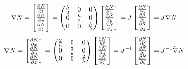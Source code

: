 \documentclass[11pt]{article}
\newcommand{\nx}{\frac{\partial N}{\partial x}}
\newcommand{\ny}{\frac{\partial N}{\partial y}}
\newcommand{\nz}{\frac{\partial N}{\partial z}}
\newcommand{\nxi}{\frac{\partial N}{\partial \xi}}
\newcommand{\neta}{\frac{\partial N}{\partial \eta}}
\newcommand{\nzeta}{\frac{\partial N}{\partial \zeta}}
\begin{document}
\begin{enumerate}
	
	\begin{equation*}
	\tilde{\nabla} N = 
	\left[
	\begin{array}{@{}c@{}}
	\nxi\\
	\neta\\
	\nzeta
	\end{array} 
	\right] = 
	\begin{pmatrix}
	\frac{h}{2} & 0  & 0   \\
	0 & \frac{h}{2} & 0   \\
	0 & 0 & \frac{h}{2}  
	\end{pmatrix} 
	\left[
	\begin{array}{@{}c@{}}
	\nx\\
	\ny\\
	\nz
	\end{array} 
	\right] = 
	J \left[
	\begin{array}{@{}c@{}}
	\nx\\
	\ny\\
	\nz
	\end{array} 
	\right] = J \nabla N
	\end{equation*} 
	\begin{equation*}
	\nabla N = 
	\left[
	\begin{array}{@{}c@{}}
	\nx\\
	\ny\\
	\nz
	\end{array} 
	\right] = 
	\begin{pmatrix}
	\frac{2}{h} & 0  & 0   \\
	0 & \frac{2}{h} & 0   \\
	0 & 0 & \frac{2}{h}  
	\end{pmatrix} 
	\left[
	\begin{array}{@{}c@{}}
	\nxi\\
	\neta\\
	\nzeta
	\end{array} 
	\right] = 
	J^{-1} 
	\left[
	\begin{array}{@{}c@{}}
	\nxi\\
	\neta\\
	\nzeta
	\end{array} 
	\right] = J^{-1} \tilde{\nabla}N
	\end{equation*}
	

\end{enumerate}
\end{document}
